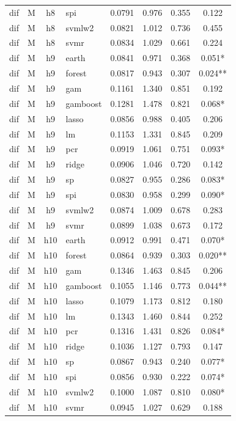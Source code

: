 \begin{ThreePartTable}
\begin{longtable}[t]{llclcccc}
dif & M & h8 & spi & 0.0791 & 0.976 & 0.355 & 0.122\\
dif & M & h8 & svmlw2 & 0.0821 & 1.012 & 0.736 & 0.455\\
dif & M & h8 & svmr & 0.0834 & 1.029 & 0.661 & 0.224\\
\addlinespace
dif & M & h9 & earth & 0.0841 & 0.971 & 0.368 & 0.051*\\
dif & M & h9 & forest & 0.0817 & 0.943 & 0.307 & 0.024**\\
dif & M & h9 & gam & 0.1161 & 1.340 & 0.851 & 0.192\\
dif & M & h9 & gamboost & 0.1281 & 1.478 & 0.821 & 0.068*\\
dif & M & h9 & lasso & 0.0856 & 0.988 & 0.405 & 0.206\\
dif & M & h9 & lm & 0.1153 & 1.331 & 0.845 & 0.209\\
dif & M & h9 & pcr & 0.0919 & 1.061 & 0.751 & 0.093*\\
dif & M & h9 & ridge & 0.0906 & 1.046 & 0.720 & 0.142\\
dif & M & h9 & sp & 0.0827 & 0.955 & 0.286 & 0.083*\\
dif & M & h9 & spi & 0.0830 & 0.958 & 0.299 & 0.090*\\
dif & M & h9 & svmlw2 & 0.0874 & 1.009 & 0.678 & 0.283\\
dif & M & h9 & svmr & 0.0899 & 1.038 & 0.673 & 0.172\\
\addlinespace
dif & M & h10 & earth & 0.0912 & 0.991 & 0.471 & 0.070*\\
dif & M & h10 & forest & 0.0864 & 0.939 & 0.303 & 0.020**\\
dif & M & h10 & gam & 0.1346 & 1.463 & 0.845 & 0.206\\
dif & M & h10 & gamboost & 0.1055 & 1.146 & 0.773 & 0.044**\\
dif & M & h10 & lasso & 0.1079 & 1.173 & 0.812 & 0.180\\
dif & M & h10 & lm & 0.1343 & 1.460 & 0.844 & 0.252\\
dif & M & h10 & pcr & 0.1316 & 1.431 & 0.826 & 0.084*\\
dif & M & h10 & ridge & 0.1036 & 1.127 & 0.793 & 0.147\\
dif & M & h10 & sp & 0.0867 & 0.943 & 0.240 & 0.077*\\
dif & M & h10 & spi & 0.0856 & 0.930 & 0.222 & 0.074*\\
dif & M & h10 & svmlw2 & 0.1000 & 1.087 & 0.810 & 0.080*\\
dif & M & h10 & svmr & 0.0945 & 1.027 & 0.629 & 0.188\\

\end{longtable}
\end{ThreePartTable}
